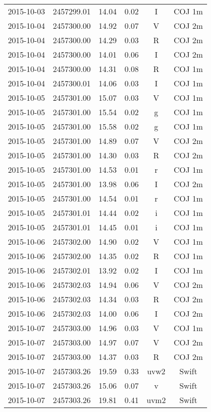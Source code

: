 \begin{table}
\begin{tabular}{cccccc}
2015-10-03 & 2457299.01 & 14.04 & 0.02 & I & COJ 1m \\
2015-10-04 & 2457300.00 & 14.92 & 0.07 & V & COJ 2m \\
2015-10-04 & 2457300.00 & 14.29 & 0.03 & R & COJ 2m \\
2015-10-04 & 2457300.00 & 14.01 & 0.06 & I & COJ 2m \\
2015-10-04 & 2457300.00 & 14.31 & 0.08 & R & COJ 1m \\
2015-10-04 & 2457300.01 & 14.06 & 0.03 & I & COJ 1m \\
2015-10-05 & 2457301.00 & 15.07 & 0.03 & V & COJ 1m \\
2015-10-05 & 2457301.00 & 15.54 & 0.02 & g & COJ 1m \\
2015-10-05 & 2457301.00 & 15.58 & 0.02 & g & COJ 1m \\
2015-10-05 & 2457301.00 & 14.89 & 0.07 & V & COJ 2m \\
2015-10-05 & 2457301.00 & 14.30 & 0.03 & R & COJ 2m \\
2015-10-05 & 2457301.00 & 14.53 & 0.01 & r & COJ 1m \\
2015-10-05 & 2457301.00 & 13.98 & 0.06 & I & COJ 2m \\
2015-10-05 & 2457301.00 & 14.54 & 0.01 & r & COJ 1m \\
2015-10-05 & 2457301.01 & 14.44 & 0.02 & i & COJ 1m \\
2015-10-05 & 2457301.01 & 14.45 & 0.01 & i & COJ 1m \\
2015-10-06 & 2457302.00 & 14.90 & 0.02 & V & COJ 1m \\
2015-10-06 & 2457302.00 & 14.35 & 0.02 & R & COJ 1m \\
2015-10-06 & 2457302.01 & 13.92 & 0.02 & I & COJ 1m \\
2015-10-06 & 2457302.03 & 14.94 & 0.06 & V & COJ 2m \\
2015-10-06 & 2457302.03 & 14.34 & 0.03 & R & COJ 2m \\
2015-10-06 & 2457302.03 & 14.00 & 0.06 & I & COJ 2m \\
2015-10-07 & 2457303.00 & 14.96 & 0.03 & V & COJ 1m \\
2015-10-07 & 2457303.00 & 14.97 & 0.07 & V & COJ 2m \\
2015-10-07 & 2457303.00 & 14.37 & 0.03 & R & COJ 2m \\
2015-10-07 & 2457303.26 & 19.59 & 0.33 & uvw2 & Swift \\
2015-10-07 & 2457303.26 & 15.06 & 0.07 & v & Swift \\
2015-10-07 & 2457303.26 & 19.81 & 0.41 & uvm2 & Swift \\

\end{tabular}
\end{table}
